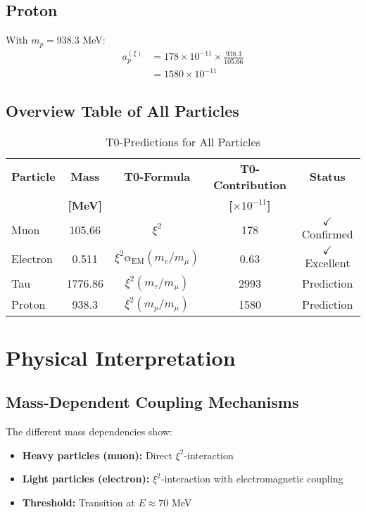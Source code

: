 \documentclass[12pt,a4paper]{article}
\newcommand{\xipar}{\xi}
\newcommand{\alphaEM}{\alpha_{\text{EM}}}
\begin{document}
	\subsection{Proton}
	
	With $m_p = 938.3$ MeV:
	\begin{align}
		a_p^{(\xipar)} &= 178 \times 10^{-11} \times \frac{938.3}{105.66} \\
		&= 1580 \times 10^{-11}
	\end{align}
	
	\subsection{Overview Table of All Particles}
	
	\begin{table}[H]
		\centering
		\caption{T0-Predictions for All Particles}
		\begin{tabular}{@{}lcccc@{}}
			\toprule
			\textbf{Particle} & \textbf{Mass} & \textbf{T0-Formula} & \textbf{T0-Contribution} & \textbf{Status} \\
			& \textbf{[MeV]} & & \textbf{[$\times 10^{-11}$]} & \\
			\midrule
			\rowcolor{green!30}
			Muon & 105.66 & $\xipar^2$ & 178 & $\checkmark$ Confirmed \\
			\rowcolor{green!30}
			Electron & 0.511 & $\xipar^2 \alphaEM (m_e/m_\mu)$ & 0.63 & $\checkmark$ Excellent \\
			\rowcolor{blue!10}
			Tau & 1776.86 & $\xipar^2 (m_\tau/m_\mu)$ & 2993 & Prediction \\
			\rowcolor{blue!10}
			Proton & 938.3 & $\xipar^2 (m_p/m_\mu)$ & 1580 & Prediction \\
			\bottomrule
		\end{tabular}
	\end{table}
	
	\section{Physical Interpretation}
	
	\subsection{Mass-Dependent Coupling Mechanisms}
	
	The different mass dependencies show:
	\begin{itemize}
		\item \textbf{Heavy particles (muon):} Direct $\xipar^2$-interaction
		\item \textbf{Light particles (electron):} $\xipar^2$-interaction with electromagnetic coupling
		\item \textbf{Threshold:} Transition at $E \approx 70$ MeV
	\end{itemize}
	
\end{document}
